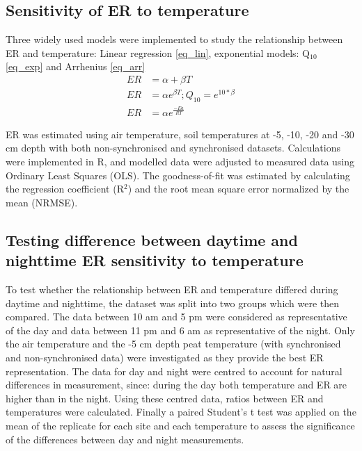\subsection{Sensitivity of ER to temperature}
Three widely used models \citet{fang2001} were implemented to study the relationship between ER and temperature: Linear regression \eqref{eq_lin}, exponential models: Q$_{10}$ \eqref{eq_exp} and Arrhenius \eqref{eq_arr}
\begin{align}
ER & = \alpha + \beta T \label{eq_lin}\\
ER & = \alpha e^{\beta T} ; Q_{10}=e^{10*\beta} \label{eq_exp}\\
ER & = \alpha e^{\frac{-Ea}{RT}} \label{eq_arr}
\end{align}


ER was estimated using air temperature, soil temperatures at -5, -10, -20 and -30 cm depth with both non-synchronised and synchronised datasets.
Calculations were implemented in R, and modelled data were adjusted to measured data using Ordinary Least Squares (OLS).
The goodness-of-fit was estimated by calculating the regression coefficient (R$^{2}$) and the root mean square error normalized by the mean (NRMSE).

\subsection{Testing difference between daytime and nighttime ER sensitivity to temperature}

To test whether the relationship between ER and temperature differed during daytime and nighttime, the dataset was split into two groups which were then compared.
The data between 10 am and 5 pm were considered as representative of the day and data between 11 pm and 6 am as representative of the night.
Only the air temperature and the -5 cm depth peat temperature (with synchronised and non-synchronised data) were investigated as they provide the best ER representation.
The data for day and night were centred to account for natural differences in measurement, since: during the day both temperature and ER are higher than in the night.
Using these centred data, ratios between ER and temperatures were calculated.
Finally a paired Student's t test was applied on the mean of the replicate for each site and each temperature to assess the significance of the differences between day and night measurements.

